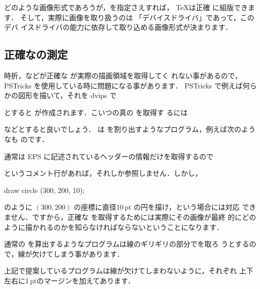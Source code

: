 どのような画像形式であろうが，\BB  を指定さえすれば， \TeX は正確
に組版できます．
%
そして，実際に画像を取り扱うのは 「デバイスドライバ」であって，このデバ
イスドライバの能力に依存して取り込める画像形式が決まります．


\subsection{正確な\BB の測定}

時折，\GS などが正確な \BB  が実際の描画領域を取得してく
れない事があるので，PSTricks を使用している時に問題になる事があります．
PSTricks で例えば何らかの図形を描いて，それを dvips で
\begin{InTerm}
\end{InTerm}
とすると  が作成されます．こいつの真の \BB  を取得す
るには
\begin{InTerm}
\end{InTerm}
などとすると良いでしょう．
 は \BB  を割り出すようなプログラム，例えば次のようなも
のです．



通常は EPS に記述されているヘッダーの\BB 情報だけを取得するので
\begin{InText}
\end{InText}
というコメント行があれば，それしか参照しません．しかし，
\begin{InText}
 draw circle (300, 200, 10);
\end{InText}
のように $(300, 200)$ の座標に直径10\,pt の円を描け，という場合には対応
できません．ですから，正確な \BB  を取得するためには実際にその画像が最終
的にどのように描かれるのかを知らなければならないということになります．

通常の \BB  を算出するようなプログラムは線のギリギリの部分で\BB  を取ろ
うとするので，線が欠けてしまう事があります．

上記で提案しているプログラムは線が欠けてしまわないように，それぞれ
上下左右に1\,ptのマージンを加えてあります．


